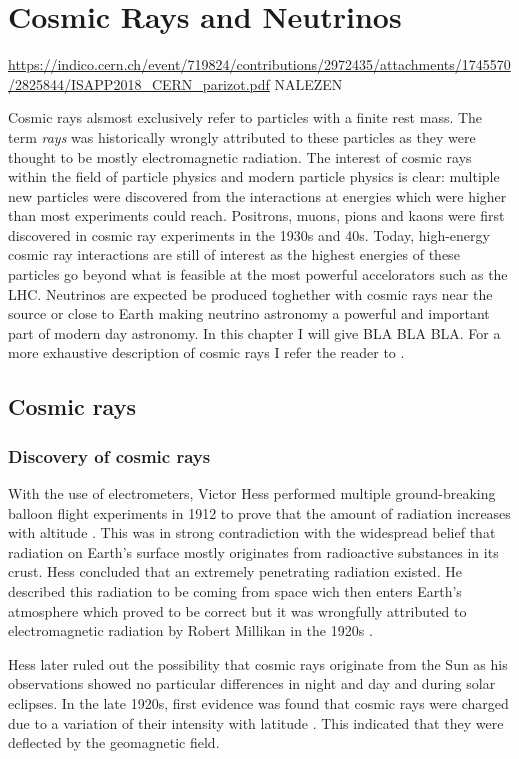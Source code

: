 \chapter{Cosmic Rays and Neutrinos}
\label{ch:cr}

\url{https://indico.cern.ch/event/719824/contributions/2972435/attachments/1745570/2825844/ISAPP2018_CERN_parizot.pdf} NALEZEN

Cosmic rays alsmost exclusively refer to particles with a finite rest mass. The term \textit{rays} was historically wrongly attributed to these particles as they were thought to be mostly electromagnetic radiation.
The interest of cosmic rays within the field of particle physics and modern particle physics is clear: multiple new particles were discovered from the interactions at energies which were higher than most experiments could reach. Positrons, muons, pions and kaons were first discovered in cosmic ray experiments in the 1930s and 40s. Today, high-energy cosmic ray interactions are still of interest as the highest energies of these particles go beyond what is feasible at the most powerful accelorators such as the LHC. Neutrinos are expected be produced toghether with cosmic rays near the source or close to Earth making neutrino astronomy a powerful and important part of modern day astronomy. In this chapter I will give BLA BLA BLA. For a more exhaustive description of cosmic rays I refer the reader to \cite{Gaisser:2016uoy}.

\section{Cosmic rays}
\subsection{Discovery of cosmic rays}
With the use of electrometers, Victor Hess performed multiple ground-breaking balloon flight experiments in 1912 to prove that the amount of radiation increases with altitude \cite{hessnobel:1936}. This was in strong contradiction with the widespread belief that radiation on Earth's surface mostly originates from radioactive substances in its crust. Hess concluded that an extremely penetrating radiation existed. He described this radiation to be coming from space wich then enters Earth's atmosphere which proved to be correct but it was wrongfully attributed to electromagnetic radiation by Robert Millikan in the 1920s \cite{PhysRev.32.533}. 

Hess later ruled out the possibility that cosmic rays originate from the Sun as his observations showed no particular differences in night and day and during solar eclipses. In the late 1920s, first evidence was found that cosmic rays were charged due to a variation of their intensity with latitude \cite{clay:1927a}. This indicated that they were deflected by the geomagnetic field.

